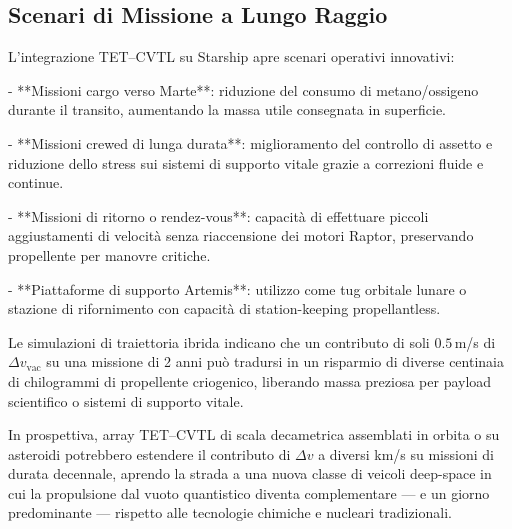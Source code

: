 \documentclass[11pt,a4paper]{article}
\theoremstyle{plain}
\theoremstyle{definition}
\begin{document}
\vspace{0.3cm}







\subsection{Scenari di Missione a Lungo Raggio}

\vspace{0.2cm}

L’integrazione TET--CVTL su Starship apre scenari operativi innovativi:

\vspace{0.2cm}

- **Missioni cargo verso Marte**: riduzione del consumo di metano/ossigeno durante il transito, aumentando la massa utile consegnata in superficie.

\vspace{0.2cm}
- **Missioni crewed di lunga durata**: miglioramento del controllo di assetto e riduzione dello stress sui sistemi di supporto vitale grazie a correzioni fluide e continue.

\vspace{0.2cm}
- **Missioni di ritorno o rendez-vous**: capacità di effettuare piccoli aggiustamenti di velocità senza riaccensione dei motori Raptor, preservando propellente per manovre critiche.

\vspace{0.2cm}
- **Piattaforme di supporto Artemis**: utilizzo come tug orbitale lunare o stazione di rifornimento con capacità di station-keeping propellantless.

\vspace{0.4cm}

Le simulazioni di traiettoria ibrida indicano che un contributo di soli $0.5$\,m/s di $\Delta v_{\text{vac}}$ su una missione di 2 anni può tradursi in un risparmio di diverse centinaia di chilogrammi di propellente criogenico, liberando massa preziosa per payload scientifico o sistemi di supporto vitale.

\vspace{0.5cm}

In prospettiva, array TET--CVTL di scala decametrica assemblati in orbita o su asteroidi potrebbero estendere il contributo di $\Delta v$ a diversi km/s su missioni di durata decennale, aprendo la strada a una nuova classe di veicoli deep-space in cui la propulsione dal vuoto quantistico diventa complementare — e un giorno predominante — rispetto alle tecnologie chimiche e nucleari tradizionali.
\end{document}
